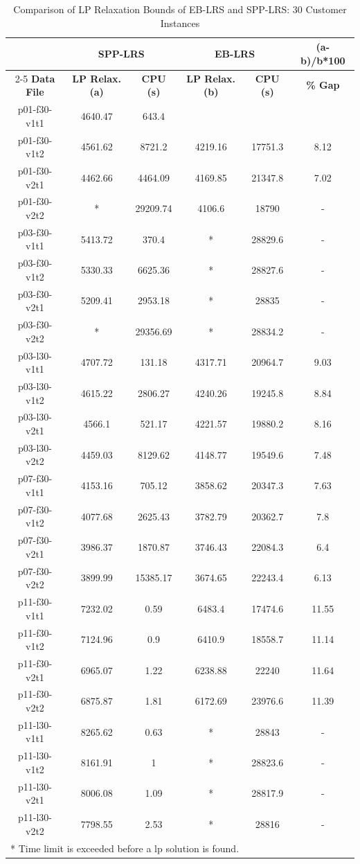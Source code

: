 \begin{table}[!hbp]
\centering
\caption{Comparison of LP Relaxation Bounds of EB-LRS and SPP-LRS: 30 Customer Instances}\label{comparesp-eb-gr2}
\begin {tabular}[t]{|c|c|c|c|c|c|}\hline
\mbox{}	&  \multicolumn{2}{|c|}{{\bf SPP-LRS}} & \multicolumn{2}{|c|}{{\bf EB-LRS}}	&	{\bf (a-b)/b*100}	\\\cline{2-5}
{\bf Data File}	& {\bf LP Relax. (a)}	& {\bf CPU (s)} & {\bf LP Relax. (b)}	&  {\bf CPU (s)} & {\bf \% Gap}	\\\hline 
p01-f30-v1t1	&	4640.47	&	643.4	&	\mbox{}	&	\mbox{}	&	\mbox{}	\\
p01-f30-v1t2	&	4561.62	&	8721.2	&	4219.16	&	17751.3	&	8.12	\\
p01-f30-v2t1	&	4462.66	&	4464.09	&	4169.85	&	21347.8	&	7.02	\\
p01-f30-v2t2	&	\mbox{*}	&	29209.74	&	4106.6	&	18790	&	\mbox{-}	\\
p03-f30-v1t1	&	5413.72	&	370.4	&	\mbox{*}	&	28829.6	&	\mbox{-}	\\
p03-f30-v1t2	&	5330.33	&	6625.36	&	\mbox{*}	&	28827.6	&	\mbox{-}	\\
p03-f30-v2t1	&	5209.41	&	2953.18	&	\mbox{*}	&	28835	&	\mbox{-}	\\
p03-f30-v2t2	&	\mbox{*}	&	29356.69	&	\mbox{*}	&	28834.2	&	\mbox{-}	\\
p03-l30-v1t1	&	4707.72	&	131.18	&	4317.71	&	20964.7	&	9.03	\\
p03-l30-v1t2	&	4615.22	&	2806.27	&	4240.26	&	19245.8	&	8.84	\\
p03-l30-v2t1	&	4566.1	&	521.17	&	4221.57	&	19880.2	&	8.16	\\
p03-l30-v2t2	&	4459.03	&	8129.62	&	4148.77	&	19549.6	&	7.48	\\
p07-f30-v1t1	&	4153.16	&	705.12	&	3858.62	&	20347.3	&	7.63	\\
p07-f30-v1t2	&	4077.68	&	2625.43	&	3782.79	&	20362.7	&	7.8	\\
p07-f30-v2t1	&	3986.37	&	1870.87	&	3746.43	&	22084.3	&	6.4	\\
p07-f30-v2t2	&	3899.99	&	15385.17	&	3674.65	&	22243.4	&	6.13	\\
p11-f30-v1t1	&	7232.02	&	0.59	&	6483.4	&	17474.6	&	11.55	\\
p11-f30-v1t2	&	7124.96	&	0.9	&	6410.9	&	18558.7	&	11.14	\\
p11-f30-v2t1	&	6965.07	&	1.22	&	6238.88	&	22240	&	11.64	\\
p11-f30-v2t2	&	6875.87	&	1.81	&	6172.69	&	23976.6	&	11.39	\\
p11-l30-v1t1	&	8265.62	&	0.63	&	\mbox{*}	&	28843	&	\mbox{-}	\\
p11-l30-v1t2	&	8161.91	&	1	&	\mbox{*}	&	28823.6	&	\mbox{-}	\\
p11-l30-v2t1	&	8006.08	&	1.09	&	\mbox{*}	&	28817.9	&	\mbox{-}	\\
p11-l30-v2t2	&	7798.55	&	2.53	&	\mbox{*}	&	28816	&	\mbox{-}	\\\hline
\multicolumn{6}{l}{* Time limit is exceeded before a lp solution is found.}
\end{tabular}
\end{table}


